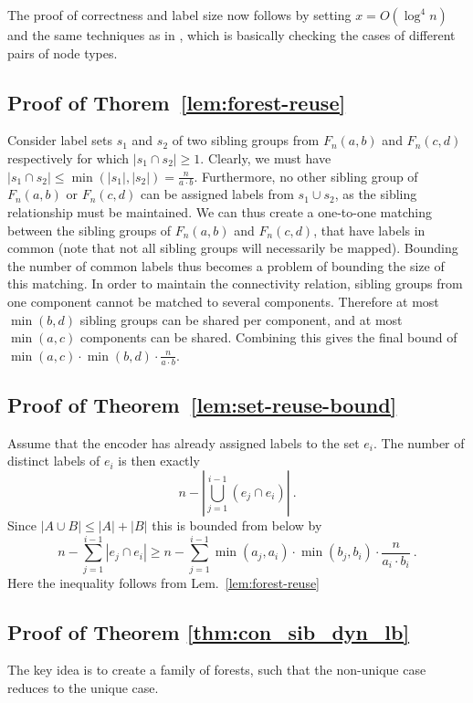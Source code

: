\documentclass{llncs}
\begin{document}
The proof of correctness and label size now follows by setting $x = O(\log^4
n)$ and the same techniques as in \cite{Alstrup02,Alstrup05}, which is
basically checking the cases of different pairs of node types.

\subsection{Proof of Thorem~\ref{lem:forest-reuse} }  \label{proof:forest-reuse}
    Consider label sets $s_1$ and $s_2$ of two sibling groups from $F_n(a,b)$ and
    $F_n(c,d)$ respectively for which $|s_1\cap s_2| \ge 1$. Clearly, we must have
    $|s_1\cap s_2| \le \min(|s_1|,|s_2|) = \frac{n}{a\cdot b}$. Furthermore, no
    other   sibling group of $F_n(a,b)$ or $F_n(c,d)$ can be assigned  labels from
    $s_1\cup s_2$, as the sibling relationship must be maintained. We can thus
    create a one-to-one matching between the sibling groups of $F_n(a,b)$ and
    $F_n(c,d)$,
    that have labels in common (note that not all sibling groups will
    necessarily be mapped). Bounding the number of common labels thus becomes a
    problem of bounding the size of this matching.
    In order to  maintain the connectivity relation, sibling groups from one component cannot be matched to several  components. Therefore at most $\min(b,d)$
    sibling groups can be shared per component, and at most $\min(a,c)$ components
    can be shared. Combining this gives the final bound of
    $\min(a,c)\cdot\min(b,d)\cdot\frac{n}{a\cdot b}$.


\subsection{Proof of Theorem~\ref{lem:set-reuse-bound} } \label{proof:set-reuse-bound}
    Assume that the encoder has already assigned labels to the set $e_i$.
    The number of distinct labels of $e_i$ is then exactly
    \[
        n - \left|\bigcup_{j=1}^{i-1} (e_j\cap e_i)\right|\ .
    \]
    Since $|A\cup B| \le |A|+|B|$ this is bounded from below by
    \[
        n - \sum_{j=1}^{i-1} |e_j\cap e_i| \ge
        n - \sum_{j=1}^{i-1} \min(a_j,a_i)\cdot \min(b_j,b_i)\cdot
        \frac{n}{a_i\cdot b_i}\ .
    \]
    Here the inequality follows from Lem.~\ref{lem:forest-reuse}
    
\subsection{Proof of Theorem
\ref{thm:con_sib_dyn_lb}}\label{proof:con_sib_dyn_lb}
The key idea is to create a family of forests, such that the non-unique case reduces to the unique case.
\end{document}
